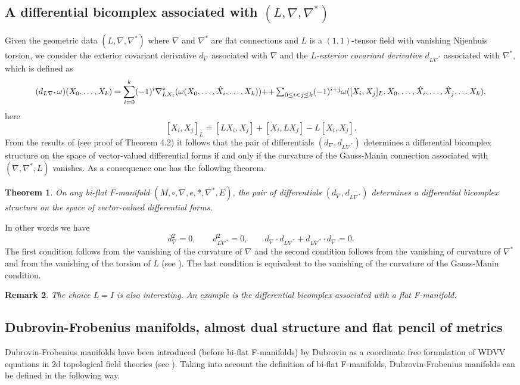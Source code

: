 \documentclass[11pt,a4paper]{amsart}
\numberwithin{equation}{section}
\newtheorem{theorem}{Theorem}[section]
\newtheorem{remark}[theorem]{Remark}
\numberwithin{equation}{section}
\begin{document}
\subsection{A differential bicomplex associated with $(L,\nabla,\nabla^*)$} 
Given the geometric data $(L,\nabla,\nabla^*)$ where $\nabla$ and $\nabla^*$ are flat connections and $L$ is a $(1,1)$-tensor field with vanishing Nijenhuis torsion,  we consider the exterior covariant derivative $d_{\nabla}$ associated with $\nabla$ and the {\em $L$-exterior covariant derivative} $d_{L\nabla^*}$ associated with $\nabla^*$, which is defined as
\[(d_{L\nabla^*}\omega)(X_0, \dots, X_k)=\sum_{i=0}^k (-1)^i \nabla^*_{LX_i}(\omega(X_0, \dots, \hat{X}_i, \dots, X_k))+$$
$$+\sum_{0\leq i<j\leq k}(-1)^{i+j}\omega([X_i, X_j]_L, X_0, \dots, \hat{X}_i, \dots, \hat{X}_j, \dots X_k),\]
here 
\[
[X_i, X_j]_L = [LX_i,X_j]+[X_i,LX_j]-L[X_i,X_j].
\]
From the results of \cite{AL_GM} (see proof of Theorem 4.2) it follows that the pair of differentials $(d_{\nabla},d_{L\nabla^*})$ determines a differential bicomplex structure on the space of vector-valued differential forms if and only if the curvature of the Gauss-Manin connection associated with $(\nabla,\nabla^*,L)$ vanishes. As  a consequence one has the following  theorem.
\begin{theorem}\label{BidifferentialTh}\cite{AL_GM}
On any bi-flat $F$-manifold $(M, \circ, \nabla, e, *, \nabla^*, E)$, the pair of differentials $(d_{\nabla},d_{L\nabla^*})$ determines a differential bicomplex structure on the space of vector-valued differential forms.
\end{theorem}
In other words we have
\[d_{\nabla}^2=0,\qquad  d_{L\nabla^*}^2=0,\qquad d_{\nabla}\cdot d_{L\nabla^*}+d_{L\nabla^*}\cdot d_{\nabla}=0.\]
The first condition follows from the vanishing of the curvature of $\nabla$ and the second condition  follows from the vanishing of  curvature of $\nabla^*$ and  from the vanishing  of the torsion of $L$ (see \cite{ALimrn}). The last condition is equivalent to the vanishing of the curvature of the Gauss-Manin condition.
\begin{remark}
The choice $L=I$ is also interesting. An example is the differential bicomplex associated with a flat F-manifold. 
\end{remark}

\subsection{Dubrovin-Frobenius manifolds, almost dual structure and flat pencil of metrics}
Dubrovin-Frobenius manifolds have been introduced (before bi-flat F-manifolds) by  Dubrovin as a coordinate free formulation of WDVV equations in 2d topological field theories (see \cite{du93}).
Taking into account the definition of bi-flat F-manifolds, Dubrovin-Frobenius manifolds can be defined in the following way.
\end{document}
